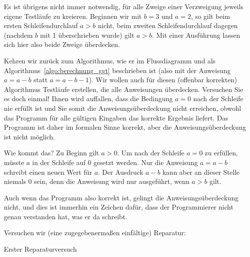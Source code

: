 \vspace{2.75mm} %

Es ist übrigens nicht immer notwendig, für alle Zweige einer Verzweigung jeweils eigene Testläufe zu kreieren. Beginnen wir mit $b=3$ und $a=2$, so gilt beim ersten Schleifendurchlauf $a>b$ nicht, beim zweiten Schleifendurchlauf dagegen (nachdem $b$ mit 1 überschrieben wurde) gilt $a>b$. Mit einer Ausführung lassen sich hier also beide Zweige überdecken.

\vspace{2.75mm} %

Kehren wir zurück zum Algorithmus, wie er im Flussdiagramm und als Algorithmus~\ref{algo:berechnung_ggt} beschrieben ist (also mit der Anweisung $a=a-b$ statt $a= a-b-1$). Wir wollen auch für diesen (offenbar korrekten) Algorithmus Testläufe erstellen, die alle Anweisungen überdecken. Versuchen Sie es doch einmal! Ihnen wird auffallen, dass die Bedingung $a=0$ nach der Schleife nie erfüllt ist und Sie somit die Anweisungsüberdeckung nicht erreichen, obwohl das Programm für alle gültigen Eingaben das korrekte Ergebnis liefert. Das Programm ist daher im formalen Sinne korrekt, aber die Anweisungsüberdeckung ist nicht möglich.

\vspace{2.75mm} %

Wie kommt das? Zu Beginn gilt $a>0$. Um nach der Schleife $a=0$ zu erfüllen, müsste $a$ in der Schleife auf 0 gesetzt werden. Nur die Anweisung $a=a-b$ schreibt einen neuen Wert für $a$. Der Ausdruck $a-b$ kann aber an dieser Stelle niemals 0 sein, denn die Anweisung wird nur ausgeführt, wenn $a>b$ gilt.

\vspace{2.75mm} %

Auch wenn das Programm also korrekt ist, gelingt die Anweisungsüberdeckung nicht, und dies ist immerhin ein Zeichen dafür, dass der Programmierer nicht genau verstanden hat, was er da schreibt. 

\pagebreak %

Versuchen wir (eine zugegebenermaßen einfältige) Reparatur:

\vspace{2mm} %

\begin{algorithm}[H]
	\caption{Erster Reparaturversuch}
	\label{algo:erster_reparaturversuch}

	\vspace{\baselineskip}


	\vspace{\baselineskip}


	\vspace{\baselineskip}

	
	\vspace{\baselineskip}
\end{algorithm}

